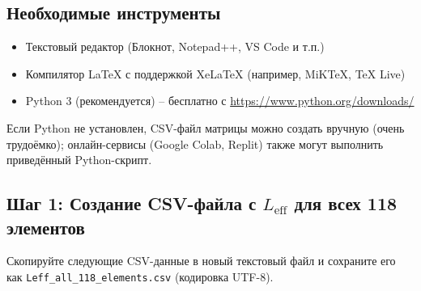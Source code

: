 \documentclass[11pt,a4paper]{article}
\begin{document}
	\subsection*{Необходимые инструменты}
	\begin{itemize}
		\item Текстовый редактор (Блокнот, Notepad++, VS Code и т.п.)
		\item Компилятор LaTeX с поддержкой XeLaTeX (например, MiKTeX, TeX Live)
		\item Python 3 (рекомендуется) – бесплатно с \url{https://www.python.org/downloads/}
	\end{itemize}
	Если Python не установлен, CSV-файл матрицы можно создать вручную (очень трудоёмко); онлайн-сервисы (Google Colab, Replit) также могут выполнить приведённый Python-скрипт.
	
	\subsection*{Шаг 1: Создание CSV-файла с \(L_{\mathrm{eff}}\) для всех 118 элементов}
	Скопируйте следующие CSV-данные в новый текстовый файл и сохраните его как \texttt{Leff\_all\_118\_elements.csv} (кодировка UTF-8).
	
\end{document}
